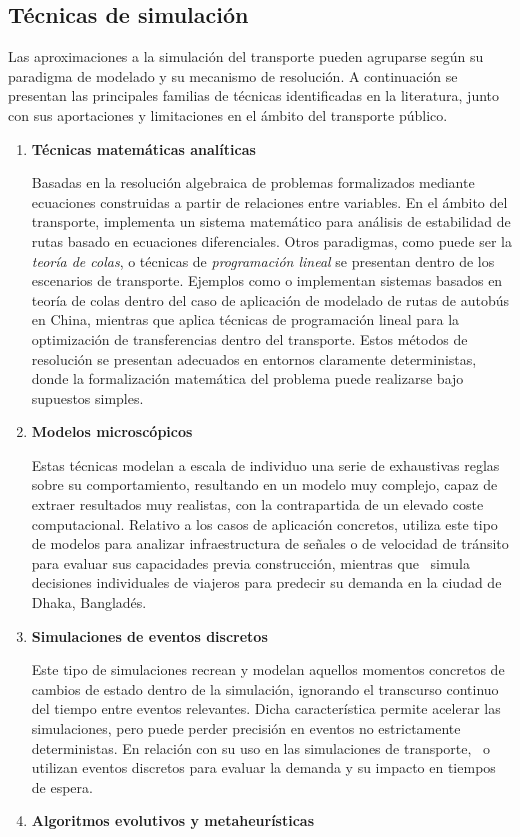 \subsection{Técnicas de simulación}
Las aproximaciones a la simulación del transporte pueden agruparse según su paradigma de modelado y su 
mecanismo de resolución. A continuación se presentan las principales familias de técnicas identificadas 
en la literatura, junto con sus aportaciones y limitaciones en el ámbito del transporte público.
\begin{enumerate}
    \item \textbf{Técnicas matemáticas analíticas}

    Basadas en la resolución algebraica de problemas formalizados mediante ecuaciones construidas a partir de 
    relaciones entre variables. En el ámbito del transporte, \textcite{Newell1964Maintaining}
    implementa un sistema matemático para análisis de estabilidad de rutas basado en ecuaciones diferenciales.
    Otros paradigmas, como puede ser la \textit{teoría de colas}, o técnicas de \textit{programación lineal}
    se presentan dentro de los escenarios de transporte.
    Ejemplos como \textcite{Wang2021Modeling} o \textcite{Wang2018BusCapacity} implementan sistemas basados en 
    teoría de colas dentro del caso de aplicación de modelado de rutas de autobús en China, mientras que 
    \textcite{Liu2023Optimizing} aplica técnicas de programación lineal para la optimización de transferencias
    dentro del transporte. Estos métodos de resolución se presentan adecuados en entornos claramente deterministas,
    donde la formalización matemática del problema puede realizarse bajo supuestos simples.
    \item \textbf{Modelos microscópicos}
    
    Estas técnicas modelan a escala de individuo una serie de exhaustivas reglas sobre su comportamiento, resultando
    en un modelo muy complejo, capaz de extraer resultados muy realistas, con la contrapartida de un elevado coste
    computacional. Relativo a los casos de aplicación concretos,
    \textcite{Li2013BRT} utiliza este tipo de modelos para analizar infraestructura de señales o de 
    velocidad de tránsito para evaluar sus capacidades previa construcción, mientras que~\textcite{Zannat2024BRT}
    simula decisiones individuales de viajeros para predecir su demanda en la ciudad de Dhaka, Bangladés.
    \item \textbf{Simulaciones de eventos discretos}
    
    Este tipo de simulaciones recrean y modelan aquellos momentos concretos de cambios de estado dentro de la simulación,
    ignorando el transcurso continuo del tiempo entre eventos relevantes. Dicha característica permite
    acelerar las simulaciones, pero puede perder precisión en eventos no estrictamente deterministas.
    En relación con su uso en las simulaciones de transporte,~\textcite{Tirachini2023DiscreteEvent} 
    o~\textcite{AriasNava2026DataDriven} utilizan eventos discretos para evaluar la demanda y su impacto en
    tiempos de espera.
    \item \textbf{Algoritmos evolutivos y metaheurísticas}


\end{enumerate}
